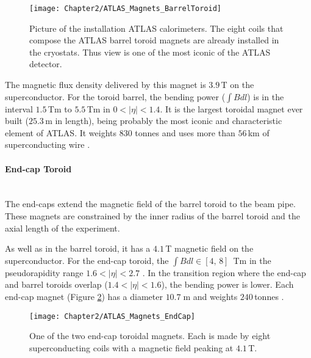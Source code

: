 \begin{figure}
	\centering
	\texttt{[image: Chapter2/ATLAS\_Magnets\_BarrelToroid]}
	\caption{Picture of the installation ATLAS calorimeters. The eight coils that compose the ATLAS barrel toroid magnets are already installed in the cryostats.
	Thus view is one of the most iconic of the ATLAS detector.}
	\label{fig:Chap2:ATLAS:Magnet:BarrelToroid}
\end{figure}

The magnetic flux density delivered by this magnet is $3.9\,$T on the superconductor.
For the toroid barrel, the bending power ($\int B dl$) is in the interval $1.5\,$Tm to $5.5\,$Tm in $0 <|\eta| <1.4$.
It is the largest toroidal magnet ever built ($25.3\,$m in length), being probably the most iconic and characteristic element of ATLAS. It
weights 830 tonnes and uses more than $56\,$km of superconducting wire \cite{ATLAS_Web_Detectors}.

\paragraph{End-cap Toroid} \mbox{}\\
The end-caps extend the magnetic field of the barrel toroid to the beam pipe. These magnets are constrained by the 
inner radius of the barrel toroid and the axial length of the experiment.
 
As well as in the barrel toroid, it has a $4.1\,$T magnetic field on the superconductor.
 For the end-cap toroid, the $\int B dl \in [4,\, 8]\,$ Tm in the pseudorapidity range $1.6 <|\eta| < 2.7$ \cite{CERN-LHCC-97-018}.
 In the transition region where the end-cap and barrel toroids overlap ($1.4 <|\eta| <1.6$), the bending power is lower.
 Each end-cap magnet (Figure \ref{fig:Chap2:ATLAS:Magnet:EndCapToroid}) has a diameter $10.7\;$m and weights $240\,$tonnes \cite{ATLAS_Web_Detectors}.
 \begin{figure}
	\centering
	\texttt{[image: Chapter2/ATLAS\_Magnets\_EndCap]}
	\caption{One of the two end-cap toroidal magnets. Each is made by eight superconducting coils with a magnetic field peaking at $4.1\,$T.}
	\label{fig:Chap2:ATLAS:Magnet:EndCapToroid}
\end{figure}


